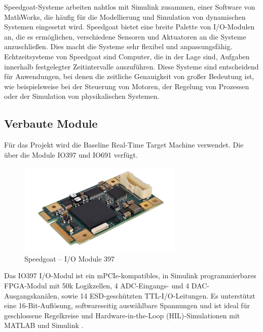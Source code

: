 Speedgoat-Systeme arbeiten nahtlos mit Simulink zusammen, einer Software von MathWorks, die häufig für die Modellierung und Simulation von dynamischen Systemen eingesetzt wird.
Speedgoat bietet eine breite Palette von I/O-Modulen an, die es ermöglichen, verschiedene Sensoren und Aktuatoren an die Systeme anzuschließen. Dies macht die Systeme sehr flexibel und anpassungsfähig.
Echtzeitsysteme von Speedgoat sind Computer, die in der Lage sind, Aufgaben innerhalb festgelegter Zeitintervalle auszuführen. Diese Systeme sind entscheidend für Anwendungen, bei denen die zeitliche Genauigkeit von großer Bedeutung ist, wie beispielsweise bei der Steuerung von Motoren, der Regelung von Prozessen oder der Simulation von physikalischen Systemen.



\subsection{Verbaute Module}

Für das Projekt wird die Baseline Real-Time Target Machine verwendet. Die über die Module IO397 und IO691 verfügt.\\

\begin{figure}[!ht]
	\begin{center}
		\includegraphics[width=0.7\textwidth]{img/2_steuerung/goat_io397.png}
		\caption{Speedgoat – I/O Module 397 \cite{speedgoat:IO397}}
		\label{img_2_2:goat:IO397}
	\end{center}
\end{figure}

Das IO397 I/O-Modul ist ein mPCIe-kompatibles, in Simulink programmierbares FPGA-Modul mit 50k Logikzellen, 4 ADC-Eingangs- und 4 DAC-Ausgangskanälen, sowie 14 ESD-geschützten TTL-I/O-Leitungen. Es unterstützt eine 16-Bit-Auflösung, softwareseitig auswählbare Spannungen und ist ideal für geschlossene Regelkreise und Hardware-in-the-Loop (HIL)-Simulationen mit MATLAB und Simulink \cite{speedgoat:IO397}.


